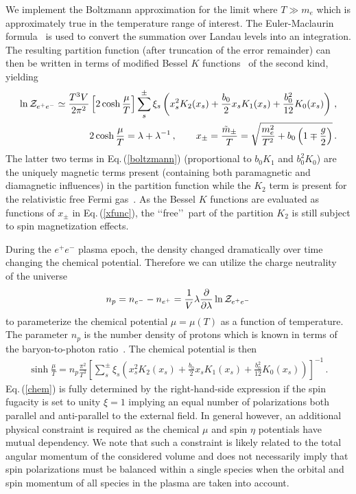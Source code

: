 \documentclass[a4paper]{article}
\newcommand{\req}[1]{Eq.\,(\ref{#1})}
\begin{document}
We implement the Boltzmann approximation for the limit where $T\gg m_e$ which is approximately true in the temperature range of interest. The Euler-Maclaurin formula~\cite{abramowitz1988handbook} is used to convert the summation over Landau levels into an integration. The resulting partition function (after truncation of the error remainder) can then be written in terms of modified Bessel $K$ functions~\cite{abramowitz1988handbook,letessier2002hadrons} of the second kind, yielding
\begin{align}
    \label{boltzmann}
    \ln{\cal Z}_{e^{+}e^{-}}\simeq\frac{T^{3}V}{2\pi^{2}}\left[2\cosh{\frac{\mu}{T}}\right]\sum_{s}^{\pm}\xi_{s}\left(x_{s}^{2}K_{2}(x_{s})+\frac{b_{0}}{2}x_{s}K_{1}(x_{s})+\frac{b_{0}^{2}}{12}K_{0}(x_{s})\right)\,,\\
    \label{xfunc}
    2\cosh{\frac{\mu}{T}}=\lambda+\lambda^{-1}\,,\qquad
    x_{\pm}=\frac{{\tilde m}_{\pm}}{T}=\sqrt{\frac{m_{e}^{2}}{T^{2}}+b_{0}\left(1\mp\frac{g}{2}\right)}\,.
\end{align}
The latter two terms in \req{boltzmann} (proportional to $b_{0}K_{1}$ and $b_{0}^{2}K_{0}$) are the uniquely magnetic terms present (containing both paramagnetic and diamagnetic influences) in the partition function while the $K_{2}$ term is present for the relativistic free Fermi gas~\cite{greiner2012thermodynamics}. As the Bessel $K$ functions are evaluated as functions of $x_{\pm}$ in \req{xfunc}, the \lq\lq free\rq\rq\ part of the partition $K_{2}$ is still subject to spin magnetization effects.

During the $e^{+}e^{-}$ plasma epoch, the density changed dramatically over time changing the chemical potential. Therefore we can utilize the charge neutrality~\cite{rafelski2023short,letessier2002hadrons} of the universe
\begin{align}
    \label{chargeneutrality}
    n_{p}=n_{e^{-}}-n_{e^{+}}=\frac{1}{V}\lambda\frac{\partial}{\partial\lambda}\ln{\cal Z}_{e^{+}e^{-}}
\end{align}
to parameterize the chemical potential $\mu=\mu(T)$ as a function of temperature. The parameter $n_{p}$ is the number density of protons which is known in terms of the baryon-to-photon ratio~\cite{workman2022pdg}. The chemical potential is then
\begin{align}
    \label{chem}
    \sinh{\frac{\mu}{T}}=n_{p}\frac{\pi^{2}}{T^{3}}\left[\sum_{s}^{\pm}\xi_{s}\left(x_{s}^{2}K_{2}(x_{s})+\frac{b_{0}}{2}x_{s}K_{1}(x_{s})+\frac{b_{0}^{2}}{12}K_{0}(x_{s})\right)\right]^{-1}\,.
\end{align}
\req{chem} is fully determined by the right-hand-side expression if the spin fugacity is set to unity $\xi=1$ implying an equal number of polarizations both parallel and anti-parallel to the external field. In general however, an additional physical constraint is required as the chemical $\mu$ and spin $\eta$ potentials have mutual dependency. We note that such a constraint is likely related to the total angular momentum of the considered volume and does not necessarily imply that spin polarizations must be balanced within a single species when the orbital and spin momentum of all species in the plasma are taken into account.
\end{document}
